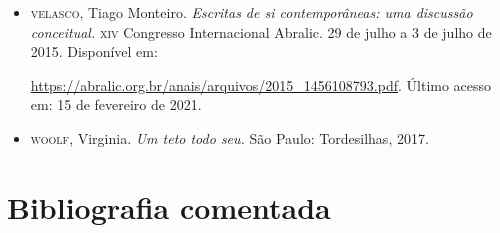 \documentclass{article}
\begin{document}
\begin{itemize}
\item[]\textsc{velasco}, Tiago Monteiro. \emph{Escritas de si contemporâneas: uma
discussão conceitual.} \textsc{xiv} Congresso Internacional Abralic. 29 de julho
a 3 de julho de 2015. Disponível em:

\url{https://abralic.org.br/anais/arquivos/2015\_1456108793.pdf}.
Último acesso em: 15 de fevereiro de 2021.

\item[]\textsc{woolf}, Virginia. \emph{Um teto todo seu.} São Paulo: Tordesilhas, 2017.
\end{itemize}

\section{Bibliografia comentada}
\end{document}
